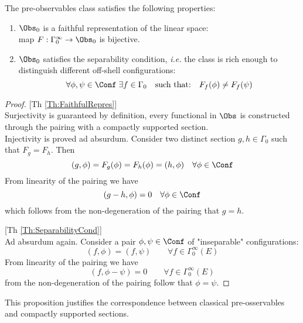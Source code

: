 \documentclass[Main]{subfiles}
\begin{document}
				\begin{proposition}
					The pre-observables class satisfies the following properties:
					\begin{enumerate}
						\item\label{Th:FaithfulRepres} $\Obs_0$ is a faithful representation of the linear space:\\
									map $F: \Gamma_0^\infty \rightarrow \Obs_0$ is bijective.
						\item\label{Th:SeparabilityCond} $\Obs_0$ satisfies the separability condition, \textit{i.e.} the class is rich enough to distinguish different off-shell configurations:
						\begin{displaymath}
							\forall \phi,\psi \in \Conf \; \exists f \in \Gamma_0 \quad \textrm{such that:} \quad F_f(\phi) \neq F_f(\psi)
						\end{displaymath}
					\end{enumerate}	
				\end{proposition}
				\begin{proof}
				
					[Th \ref{Th:FaithfulRepres}]\\
					Surjectivity is guaranteed by definition, every functional in $\Obs$ is constructed through the pairing with a compactly supported section.\\
					Injectivity is proved ad absurdum.
					Consider two distinct section $g,h \in \Gamma_0$ such that $F_g = F_h$. Then
					\begin{displaymath}
						 ( g, \phi) = F_g(\phi) = F_h(\phi) = (h, \phi)  \quad \forall \phi \in \Conf
					\end{displaymath}
					From linearity of the pairing we have 
					\begin{displaymath}
						(g-h, \phi) = 0 \quad\forall \phi \in \Conf
					\end{displaymath}
					which follows from the non-degeneration of the pairing that $g=h$.
					
					[Th \ref{Th:SeparabilityCond}]\\
					Ad absurdum again.
					Consider a pair $\phi,\psi \in \Conf$ of "inseparable" configurations:
					\begin{displaymath}
						(f, \phi) = (f, \psi) \qquad \forall f \in \Gamma_0^\infty(E)
					\end{displaymath}
					From linearity of the pairing we have 
					\begin{displaymath}
						(f, \phi-\psi) = 0 \qquad \forall f \in \Gamma_0^\infty(E)
					\end{displaymath}
					from the non-degeneration of the pairing follow that $\phi = \psi$.
				\end{proof}
				This proposition justifies the correspondence between classical pre-osservables and compactly supported sections.
			
\end{document}
